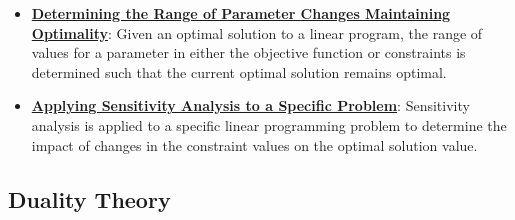 \documentclass{article}%
\begin{document}
\begin{itemize}[leftmargin=*]
\item \href{https://www.math.purdue.edu/~yipn/421/2024-12-03-Duality.pdf#page=16}{\textbf{Determining the Range of Parameter Changes Maintaining Optimality}}: Given an optimal solution to a linear program, the range of values for a parameter in either the objective function or constraints is determined such that the current optimal solution remains optimal.%
\item \href{https://www.math.purdue.edu/~yipn/421/2024-12-03-Duality.pdf#page=26}{\textbf{Applying Sensitivity Analysis to a Specific Problem}}: Sensitivity analysis is applied to a specific linear programming problem to determine the impact of changes in the constraint values on the optimal solution value.%
\end{itemize}

%
\subsection{Duality Theory}%
\label{subsec:DualityTheory}%
\end{document}
